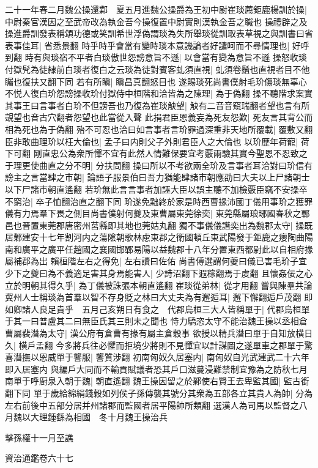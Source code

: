二十一年春二月魏公操還鄴　夏五月進魏公操爵為王初中尉崔琰薦鉅鹿楊訓於操|{
	中尉秦官漢因之至武帝改為執金吾今操復置中尉實則漢執金吾之職也}
操禮辟之及操進爵訓發表稱頌功德或笑訓希世浮偽謂琰為失所舉琰從訓取表草視之與訓書曰省表事佳耳|{
	省悉景翻}
時乎時乎會當有變時琰本意譏論者好譴呵而不尋情理也|{
	好呼到翻}
時有與琰宿不平者白琰傲世怨謗意旨不遜|{
	以會當有變為意旨不遜}
操怒收琰付獄髠為徒隸前白琰者復白之云琰為徒對賓客虬須直視|{
	虬須卷鬚也直視者目不他矚也復扶又翻下同}
若有所瞋|{
	瞋昌真翻怒目也}
遂賜琰死尚書僕射毛玠傷琰無辜心不悦人復白玠怨謗操收玠付獄侍中桓階和洽皆為之陳理|{
	為于偽翻}
操不聽階求案實其事王曰言事者白玠不但謗吾也乃復為崔琰觖望|{
	觖有二音音窺瑞翻者望也言有所覬望也音古穴翻者怨望也此當從入聲}
此捐君臣恩義妄為死友怨歎|{
	死友言其背公而相為死也為于偽翻}
殆不可忍也洽曰如言事者言玠罪過深重非天地所覆載|{
	覆敷又翻}
臣非敢曲理玠以枉大倫也|{
	孟子曰内則父子外則君臣人之大倫也}
以玠歷年荷寵|{
	荷下可翻}
剛直忠公為衆所憚不宜有此然人情難保要宜考覈兩驗其實今聖恩不忍致之于理更使曲直之分不明|{
	分扶問翻}
操曰所以不考欲兩全玠及言事者耳洽對曰玠信有謗主之言當肆之市朝|{
	論語子服景伯曰吾力猶能肆諸市朝應劭曰大夫以上尸諸朝士以下尸諸市朝直遙翻}
若玠無此言言事者加誣大臣以誤主聽不加檢覈臣竊不安操卒不窮治|{
	卒子恤翻治直之翻下同}
玠遂免黜終於家是時西曹掾沛國丁儀用事玠之獲罪儀有力焉羣下畏之側目尚書僕射何夔及東曹屬東莞徐奕|{
	東莞縣屬琅琊國春秋之鄆邑也晉置東莞郡唐密州莒縣即其地也莞姑丸翻}
獨不事儀儀譖奕出為魏郡太守|{
	操既居鄴建安十七年割河内之蕩隂朝歌林慮東郡之衛國頓丘東武陽發于鉅鹿之癭陶曲陽南和廣平之廣平任趙國之襄國邯鄲易陽以益魏郡十八年分置東西都尉此以自相府掾屬補郡為出}
賴桓階左右之得免|{
	左右讀曰佐佑}
尚書傅選謂何夔曰儀已害毛玠子宜少下之夔曰為不義適足害其身焉能害人|{
	少詩沼翻下遐稼翻焉于䖍翻}
且懷姦佞之心立於明朝其得久乎|{
	為丁儀被誅張本朝直遙翻}
崔琰從弟林|{
	從才用翻}
嘗與陳羣共論冀州人士稱琰為首羣以智不存身貶之林曰大丈夫為有邂逅耳|{
	邂下懈翻逅戶茂翻}
即如卿諸人良足貴乎　五月己亥朔日有食之　代郡烏桓三大人皆稱單于|{
	代郡烏桓單于其一曰普盧其二曰無臣氏其三則未之聞也}
恃力驕恣太守不能治魏王操以丞相倉曹屬裴潛為太守|{
	漢公府有倉曹有掾有屬主倉穀事}
欲授以精兵潛曰單于自知放横日久|{
	横戶孟翻}
今多將兵往必懼而拒境少將則不見憚宜以計謀圖之遂單車之郡單于驚喜潛撫以恩威單于讋服|{
	讋質涉翻}
初南匈奴久居塞内|{
	南匈奴自光武建武二十六年即入居塞内}
與編戶大同而不輸貢賦議者恐其戶口滋蔓浸難禁制宜豫為之防秋七月南單于呼㕑泉入朝于魏|{
	朝直遙翻}
魏王操因留之於鄴使右賢王去卑監其國|{
	監古銜翻下同}
單于歲給綿絹錢穀如列侯子孫傳襲其號分其衆為五部各立其貴人為帥|{
	分為左右前後中五部分居并州諸郡而監國者居平陽帥所類翻}
選漢人為司馬以監督之八月魏以大理鍾繇為相國　冬十月魏王操治兵

擊孫權十一月至譙

資治通鑑卷六十七
